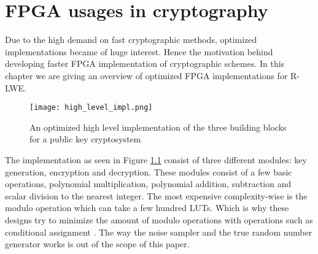 \chapter{FPGA usages in cryptography\label{FPGA_crypto}}
Due to the high demand on fast cryptographic methods, optimized implementations
became of huge interest. Hence the motivation behind developing faster FPGA
implementation of cryptographic schemes. In this chapter we are giving an
overview of optimized FPGA implementations for R-LWE.

\begin{figure}[H]

    \texttt{[image: high\_level\_impl.png]}
    \caption{An optimized high level implementation of the three building
    blocks for a public key cryptosystem \citep{FPGA_Post_Quantum_Primitives}}
    \label{fig:high_level_pkc_impl}

\end{figure}

The implementation as seen in Figure \ref{fig:high_level_pkc_impl} consist of
three different modules: key generation, encryption and decryption. These
modules consist of a few basic operations, polynomial multiplication,
polynomial addition, subtraction and scalar division to the nearest integer.
The most expensive complexity-wise is the modulo operation which can take a few
hundred LUTs. Which is why these designs try to minimize the amount of modulo
operations with operations such as conditional assignment
\citep{FPGA_Post_Quantum_Primitives}. The way the noise sampler and the true
random number generator works is out of the scope of this paper.

